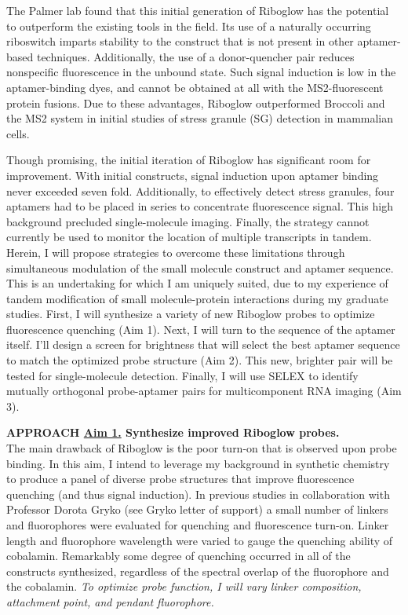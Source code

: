 The Palmer lab found that this initial generation of Riboglow has the potential to outperform the existing tools in the field. Its use of a naturally occurring riboswitch imparts stability to the construct that is not present in other aptamer-based techniques. Additionally, the use of a donor-quencher pair reduces nonspecific fluorescence in the unbound state. Such signal induction is low in the aptamer-binding dyes, and cannot be obtained at all with the MS2-fluorescent protein fusions. Due to these advantages, Riboglow outperformed Broccoli and the MS2 system in initial studies of stress granule (SG) detection in mammalian cells.

Though promising, the initial iteration of Riboglow has significant room for improvement. With initial constructs, signal induction upon aptamer binding never exceeded seven fold. Additionally, to effectively detect stress granules, four aptamers had to be placed in series to concentrate fluorescence signal. This high background precluded single-molecule imaging. Finally, the strategy cannot currently be used to monitor the location of multiple transcripts in tandem. Herein, I will propose strategies to overcome these limitations through simultaneous modulation of the small molecule construct and aptamer sequence. This is an undertaking for which I am uniquely suited, due to my experience of tandem modification of small molecule-protein interactions during my graduate studies. First, I will synthesize a variety of new Riboglow probes to optimize fluorescence quenching (Aim 1). Next, I will turn to the sequence of the aptamer itself. I'll design a screen for brightness that will select the best aptamer sequence to match the optimized probe structure (Aim 2). This new, brighter pair will be tested for single-molecule detection. Finally, I will use SELEX to identify mutually orthogonal probe-aptamer pairs for multicomponent RNA imaging (Aim 3).

\textbf{APPROACH \underline{Aim 1.} Synthesize improved Riboglow probes.}\\
The main drawback of Riboglow is the poor turn-on that is observed upon probe binding. In this aim, I intend to leverage my background in synthetic chemistry to produce a panel of diverse probe structures that improve fluorescence quenching (and thus signal induction). In previous studies in collaboration with Professor Dorota Gryko (see Gryko letter of support) a small number of linkers and fluorophores were evaluated for quenching and fluorescence turn-on. Linker length and fluorophore wavelength were varied to gauge the quenching ability of cobalamin. Remarkably some degree of quenching occurred in all of the constructs synthesized, regardless of the spectral overlap of the fluorophore and the cobalamin. \textit{To optimize probe function, I will vary linker composition, attachment point, and pendant fluorophore.}

